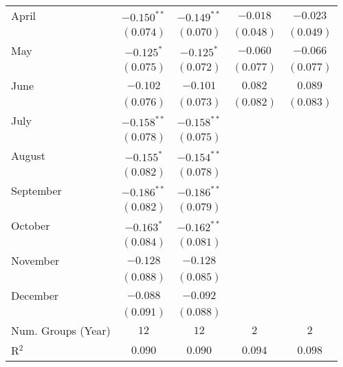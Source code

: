 \begin{table}
\begin{center}
\begin{tabular}{l c c c c}
April                   & $-0.150^{**}$  & $-0.149^{**}$  & $-0.018$       & $-0.023$       \\
                        & $(0.074)$      & $(0.070)$      & $(0.048)$      & $(0.049)$      \\
May                     & $-0.125^{*}$   & $-0.125^{*}$   & $-0.060$       & $-0.066$       \\
                        & $(0.075)$      & $(0.072)$      & $(0.077)$      & $(0.077)$      \\
June                    & $-0.102$       & $-0.101$       & $0.082$        & $0.089$        \\
                        & $(0.076)$      & $(0.073)$      & $(0.082)$      & $(0.083)$      \\
July                    & $-0.158^{**}$  & $-0.158^{**}$  &                &                \\
                        & $(0.078)$      & $(0.075)$      &                &                \\
August                  & $-0.155^{*}$   & $-0.154^{**}$  &                &                \\
                        & $(0.082)$      & $(0.078)$      &                &                \\
September               & $-0.186^{**}$  & $-0.186^{**}$  &                &                \\
                        & $(0.082)$      & $(0.079)$      &                &                \\
October                 & $-0.163^{*}$   & $-0.162^{**}$  &                &                \\
                        & $(0.084)$      & $(0.081)$      &                &                \\
November                & $-0.128$       & $-0.128$       &                &                \\
                        & $(0.088)$      & $(0.085)$      &                &                \\
December                & $-0.088$       & $-0.092$       &                &                \\
                        & $(0.091)$      & $(0.088)$      &                &                \\
\midrule
Num. Groups (Year)      & $12$           & $12$           & $2$            & $2$            \\
R$^2$                   & $0.090$        & $0.090$        & $0.094$        & $0.098$        \\

\end{tabular}
\end{center}
\end{table}
